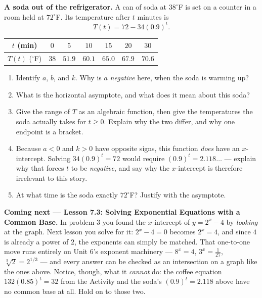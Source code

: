 \documentclass[10pt]{article}
\begin{document}
\begin{extensionbox}
\textbf{A soda out of the refrigerator.} A can of soda at $38^{\circ}$F is set on a counter in a
room held at $72^{\circ}$F. Its temperature after $t$ minutes is
\[
  T(t) = 72 - 34(0.9)^{t}.
\]
\begin{center}
\renewcommand{\arraystretch}{1.25}
\begin{tabular}{|c|c|c|c|c|c|c|}
\hline
$t$ (min) & $0$ & $5$ & $10$ & $15$ & $20$ & $30$ \\ \hline
$T(t)$ ($^{\circ}$F) & $38$ & $51.9$ & $60.1$ & $65.0$ & $67.9$ & $70.6$ \\ \hline
\end{tabular}
\end{center}
\begin{enumerate}[label=(\alph*), leftmargin=1.8em, itemsep=5pt]
  \item Identify $a$, $b$, and $k$. Why is $a$ \emph{negative} here, when the soda is warming up?
  \item What is the horizontal asymptote, and what does it mean about this soda?
  \item Give the range of $T$ as an algebraic function, then give the temperatures the soda actually
        takes for $t\ge0$. Explain why the two differ, and why one endpoint is a bracket.
  \item Because $a<0$ and $k>0$ have opposite signs, this function \emph{does} have an
        $x$-intercept. Solving $34(0.9)^{t}=72$ would require $(0.9)^{t}=2.118\ldots$ --- explain why
        that forces $t$ to be \emph{negative}, and say why the $x$-intercept is therefore irrelevant
        to this story.
  \item At what time is the soda exactly $72^{\circ}$F? Justify with the asymptote.
\end{enumerate}
\end{extensionbox}

\begin{spiralbox}
\textbf{Coming next --- Lesson 7.3: Solving Exponential Equations with a Common Base.} In problem 3
you found the $x$-intercept of $y=2^{x}-4$ by \emph{looking} at the graph. Next lesson you solve for
it: $2^{x}-4=0$ becomes $2^{x}=4$, and since $4$ is already a power of $2$, the exponents can simply
be matched. That one-to-one move runs entirely on Unit 6's exponent machinery --- $8^{x}=4$,
$3^{x}=\frac{1}{27}$, $\sqrt[3]{2}=2^{1/3}$ --- and every answer can be checked as an intersection on
a graph like the ones above. Notice, though, what it \emph{cannot} do: the coffee equation
$132(0.85)^{t}=32$ from the Activity and the soda's $(0.9)^{t}=2.118$ above have no common base at
all. Hold on to those two.
\end{spiralbox}
\end{document}
